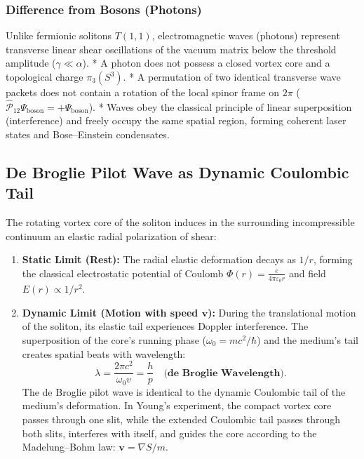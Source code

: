 \documentclass[12pt,a4paper]{article}
\begin{document}
\subsubsection{Difference from Bosons (Photons)}
	Unlike fermionic solitons $T(1,1)$, electromagnetic waves (photons) represent transverse linear shear oscillations of the vacuum matrix below the threshold amplitude ($\gamma \ll \alpha$). 
	* A photon does not possess a closed vortex core and a topological charge $\pi_3(S^3)$.
	* A permutation of two identical transverse wave packets does not contain a rotation of the local spinor frame on $2\pi$ ($\hat{\mathcal{P}}_{12} \Psi_{\text{boson}} = +\Psi_{\text{boson}}$).
	* Waves obey the classical principle of linear superposition (interference) and freely occupy the same spatial region, forming coherent laser states and Bose--Einstein condensates.
									
\subsection{De Broglie Pilot Wave as Dynamic Coulombic Tail}
	The rotating vortex core of the soliton induces in the surrounding incompressible continuum an elastic radial polarization of shear:
	\begin{enumerate}
	\item \textbf{Static Limit (Rest):} The radial elastic deformation decays as $1/r$, forming the classical electrostatic potential of Coulomb $\Phi(r) = \frac{e}{4\pi\varepsilon_0 r}$ and field $E(r) \propto 1/r^2$.
	\item \textbf{Dynamic Limit (Motion with speed $\mathbf{v}$):} During the translational motion of the soliton, its elastic tail experiences Doppler interference. The superposition of the core's running phase ($\omega_0 = mc^2/\hbar$) and the medium's tail creates spatial beats with wavelength:
	\begin{equation}
	\lambda = \frac{2\pi c^2}{\omega_0 v} = \frac{h}{p} \quad \mathbf{\text{(de Broglie Wavelength)}}.
	\end{equation}
	The de Broglie pilot wave is identical to the dynamic Coulombic tail of the medium's deformation. In Young's experiment, the compact vortex core passes through one slit, while the extended Coulombic tail passes through both slits, interferes with itself, and guides the core according to the Madelung--Bohm law: $\mathbf{v} = \nabla S / m$.
	\end{enumerate}									
\end{document}

